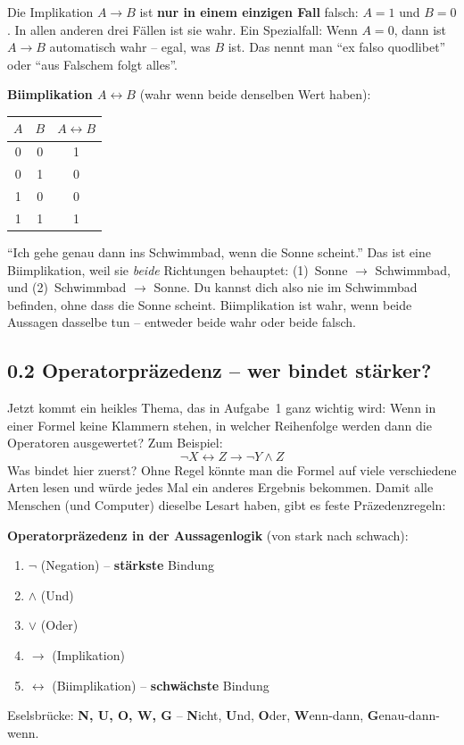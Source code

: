 \documentclass[a4paper,12pt]{article}
\begin{document}
\begin{merkbox}
Die Implikation $A \to B$ ist \textbf{nur in einem einzigen Fall}
falsch: $A = 1$ und $B = 0$. In allen anderen drei F\"allen ist sie
wahr. Ein Spezialfall: Wenn $A = 0$, dann ist $A \to B$ automatisch
wahr -- egal, was $B$ ist. Das nennt man "`ex falso quodlibet"' oder
"`aus Falschem folgt alles"'.
\end{merkbox}

\textbf{Biimplikation $A \leftrightarrow B$} (wahr wenn beide
denselben Wert haben):

\begin{center}
\renewcommand{\arraystretch}{1.2}
\begin{tabular}{cc|c}
\toprule
$A$ & $B$ & $A \leftrightarrow B$ \\
\midrule
0 & 0 & 1 \\
0 & 1 & 0 \\
1 & 0 & 0 \\
1 & 1 & 1 \\
\bottomrule
\end{tabular}
\end{center}

\begin{analogie}
"`Ich gehe genau dann ins Schwimmbad, wenn die Sonne scheint."' Das
ist eine Biimplikation, weil sie \emph{beide} Richtungen behauptet:
(1)~Sonne $\to$ Schwimmbad, und (2)~Schwimmbad $\to$ Sonne. Du kannst
dich also nie im Schwimmbad befinden, ohne dass die Sonne scheint.
Biimplikation ist wahr, wenn beide Aussagen dasselbe tun -- entweder
beide wahr oder beide falsch.
\end{analogie}

\subsection*{0.2 Operatorpr\"azedenz -- wer bindet st\"arker?}

Jetzt kommt ein heikles Thema, das in Aufgabe~1 ganz wichtig wird:
Wenn in einer Formel keine Klammern stehen, in welcher Reihenfolge
werden dann die Operatoren ausgewertet? Zum Beispiel:
\[
\neg X \leftrightarrow Z \to \neg Y \wedge Z
\]
Was bindet hier zuerst? Ohne Regel k\"onnte man die Formel auf viele
verschiedene Arten lesen und w\"urde jedes Mal ein anderes Ergebnis
bekommen. Damit alle Menschen (und Computer) dieselbe Lesart haben,
gibt es feste Pr\"azedenzregeln:

\begin{merkbox}
\textbf{Operatorpr\"azedenz in der Aussagenlogik} (von stark nach schwach):
\begin{enumerate}[nosep]
\item $\neg$ (Negation) -- \textbf{st\"arkste} Bindung
\item $\wedge$ (Und)
\item $\vee$ (Oder)
\item $\to$ (Implikation)
\item $\leftrightarrow$ (Biimplikation) -- \textbf{schw\"achste} Bindung
\end{enumerate}
Eselsbr\"ucke: \textbf{N, U, O, W, G} -- \textbf{N}icht, \textbf{U}nd,
\textbf{O}der, \textbf{W}enn-dann, \textbf{G}enau-dann-wenn.
\end{merkbox}
\end{document}
